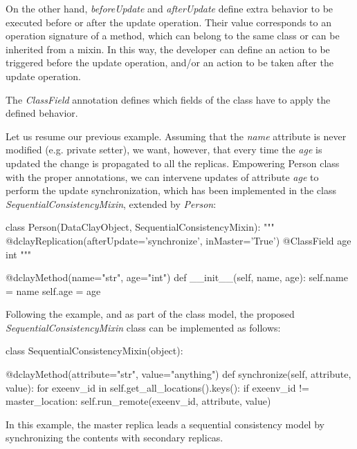 On the other hand, \textit{beforeUpdate} and \textit{afterUpdate} define extra behavior to be executed before or after the update operation. Their value corresponds to an operation signature of a method, which can belong to the same class or can be inherited from a mixin. In this way, the developer can define an action to be triggered before the update operation, and/or an action to be taken after the update operation.

The \textit{ClassField} annotation defines which fields of the class have to apply the defined behavior.

Let us resume our previous example. Assuming that the \textit{name} attribute is never modified (e.g. private setter), we want, however, that every time the \textit{age} is updated the change is propagated to all the replicas. Empowering Person class with the proper annotations, we can intervene updates of attribute \textit{age} to perform the update synchronization, which has been implemented in the class \textit{SequentialConsistencyMixin}, extended by \textit{Person}:

\begin{tBox}
\begin{python}
class Person(DataClayObject, SequentialConsistencyMixin):
    """ 
    @dclayReplication(afterUpdate='synchronize', inMaster='True')
    @ClassField age int
    """

    @dclayMethod(name="str", age="int")
    def __init__(self, name, age):
        self.name = name
        self.age = age

\end{python}
\end{tBox}

Following the example, and as part of the class model, the proposed \textit{SequentialConsistencyMixin} class can be implemented as follows:
\begin{tBox}
\begin{python}
class SequentialConsistencyMixin(object):

    @dclayMethod(attribute="str", value="anything")
    def synchronize(self, attribute, value):
        for exeenv_id in self.get_all_locations().keys():
            if exeenv_id != master_location:
                self.run_remote(exeenv_id, attribute, value)

\end{python}
\end{tBox}

In this example, the master replica leads a sequential consistency model by synchronizing the contents with secondary replicas.

